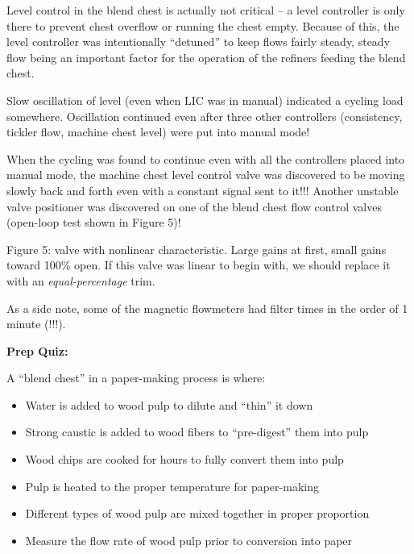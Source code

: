 Level control in the blend chest is actually not critical -- a level controller is only there to prevent chest overflow or running the chest empty.  Because of this, the level controller was intentionally ``detuned'' to keep flows fairly steady, steady flow being an important factor for the operation of the refiners feeding the blend chest.

\vskip 10pt

Slow oscillation of level (even when LIC was in manual) indicated a cycling load somewhere.  Oscillation continued even after three other controllers (consistency, tickler flow, machine chest level) were put into manual mode!

\vskip 10pt

When the cycling was found to continue even with all the controllers placed into manual mode, the machine chest level control valve was discovered to be moving slowly back and forth even with a constant signal sent to it!!!  Another unstable valve positioner was discovered on one of the blend chest flow control valves (open-loop test shown in Figure 5)!

\vskip 10pt

Figure 5: valve with nonlinear characteristic.  Large gains at first, small gains toward 100\% open.  If this valve was linear to begin with, we should replace it with an {\it equal-percentage} trim.

\vskip 10pt

As a side note, some of the magnetic flowmeters had filter times in the order of 1 minute (!!!).








\vfil \eject

\noindent
{\bf Prep Quiz:}

A ``blend chest'' in a paper-making process is where:

\begin{itemize}
\item{} Water is added to wood pulp to dilute and ``thin'' it down
\vskip 5pt 
\item{} Strong caustic is added to wood fibers to ``pre-digest'' them into pulp
\vskip 5pt 
\item{} Wood chips are cooked for hours to fully convert them into pulp
\vskip 5pt 
\item{} Pulp is heated to the proper temperature for paper-making
\vskip 5pt 
\item{} Different types of wood pulp are mixed together in proper proportion
\vskip 5pt 
\item{} Measure the flow rate of wood pulp prior to conversion into paper
\end{itemize}





